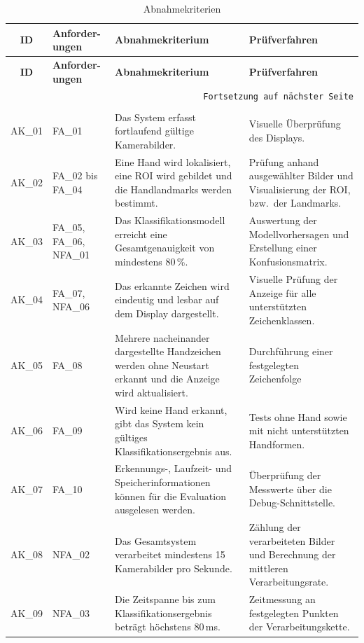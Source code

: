 \begin{longtable}{|c|p{1.65cm}|p{}|p{}|}
    \hline
    \textbf{ID} & \textbf{Anforder-ungen} & \textbf{Abnahmekriterium} & \textbf{Prüfverfahren} \\
    \hline
    \endfirsthead
    \hline
    \textbf{ID} & \textbf{Anforder-ungen} & \textbf{Abnahmekriterium} & \textbf{Prüfverfahren} \\
    \hline
    \endhead
    \hline
    \multicolumn{4}{r}{\texttt{Fortsetzung auf nächster Seite}} \\
    \endfoot
    \caption{Abnahmekriterien}
    \label{tab:abnahmekriterien} \\
    \endlastfoot
    AK\_01 & FA\_01 & Das System erfasst fortlaufend gültige Kamerabilder. & Visuelle Überprüfung des Displays. \\
    \hline
    AK\_02 & FA\_02 bis FA\_04 & Eine Hand wird lokalisiert, eine ROI wird gebildet und die Handlandmarks werden bestimmt. & Prüfung anhand ausgewählter Bilder und Visualisierung der ROI, bzw.\ der Landmarks. \\
    \hline
    AK\_03 & FA\_05, FA\_06, NFA\_01 & Das Klassifikationsmodell erreicht eine Gesamtgenauigkeit von mindestens 80\,\%. & Auswertung der Modellvorhersagen und Erstellung einer Konfusionsmatrix. \\
    \hline
    AK\_04 & FA\_07, NFA\_06 & Das erkannte Zeichen wird eindeutig und lesbar auf dem Display dargestellt. & Visuelle Prüfung der Anzeige für alle unterstützten Zeichenklassen. \\
    \hline
    AK\_05 & FA\_08 & Mehrere nacheinander dargestellte Handzeichen werden ohne Neustart erkannt und die Anzeige wird aktualisiert. & Durchführung einer festgelegten Zeichenfolge \\
    \hline
    AK\_06 & FA\_09 & Wird keine Hand erkannt, gibt das System kein gültiges Klassifikationsergebnis aus. & Tests ohne Hand sowie mit nicht unterstützten Handformen. \\
    \hline
    AK\_07 & FA\_10 & Erkennungs-, Laufzeit- und Speicherinformationen können für die Evaluation ausgelesen werden. & Überprüfung der Messwerte über die Debug-Schnittstelle. \\
    \hline
    AK\_08 & NFA\_02 & Das Gesamtsystem verarbeitet mindestens 15 Kamerabilder pro Sekunde. & Zählung der verarbeiteten Bilder und Berechnung der mittleren Verarbeitungsrate. \\
    \hline
    AK\_09 & NFA\_03 & Die Zeitspanne bis zum Klassifikationsergebnis beträgt höchstens 80\,ms. & Zeitmessung an festgelegten Punkten der Verarbeitungskette. \\

\end{longtable}
